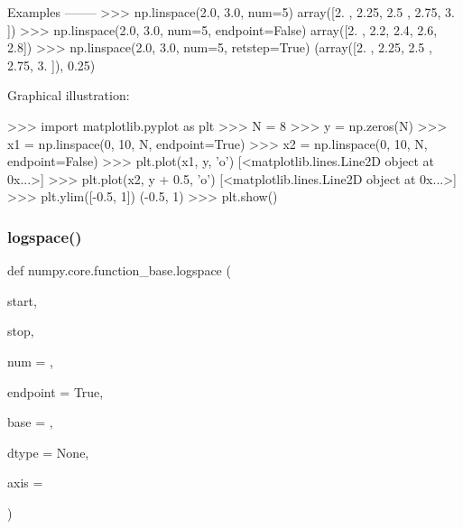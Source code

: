 \begin{DoxyVerb}
Examples
--------
>>> np.linspace(2.0, 3.0, num=5)
array([2.  , 2.25, 2.5 , 2.75, 3.  ])
>>> np.linspace(2.0, 3.0, num=5, endpoint=False)
array([2. ,  2.2,  2.4,  2.6,  2.8])
>>> np.linspace(2.0, 3.0, num=5, retstep=True)
(array([2.  ,  2.25,  2.5 ,  2.75,  3.  ]), 0.25)

Graphical illustration:

>>> import matplotlib.pyplot as plt
>>> N = 8
>>> y = np.zeros(N)
>>> x1 = np.linspace(0, 10, N, endpoint=True)
>>> x2 = np.linspace(0, 10, N, endpoint=False)
>>> plt.plot(x1, y, 'o')
[<matplotlib.lines.Line2D object at 0x...>]
>>> plt.plot(x2, y + 0.5, 'o')
[<matplotlib.lines.Line2D object at 0x...>]
>>> plt.ylim([-0.5, 1])
(-0.5, 1)
>>> plt.show()\end{DoxyVerb}
 \mbox{\label{namespacenumpy_1_1core_1_1function__base_a5ceb5a989bdff2dff89633612912686f}} 
\subsubsection{\texorpdfstring{logspace()}{logspace()}}
{\footnotesize\ttfamily def numpy.\+core.\+function\+\_\+base.\+logspace (\begin{DoxyParamCaption}\item[{}]{start,  }\item[{}]{stop,  }\item[{}]{num = {},  }\item[{}]{endpoint = {\ttfamily True},  }\item[{}]{base = {},  }\item[{}]{dtype = {\ttfamily None},  }\item[{}]{axis = {} }\end{DoxyParamCaption})}

